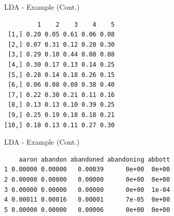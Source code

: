 \documentclass[
  ignorenonframetext,
  aspectratio=169]{beamer}
\newenvironment{Shaded}{\begin{snugshade}}{\end{snugshade}}
\newcommand{\CommentTok}[1]{\textcolor[rgb]{0.56,0.35,0.01}{\textit{#1}}}
\newcommand{\DecValTok}[1]{\textcolor[rgb]{0.00,0.00,0.81}{#1}}
\newcommand{\FunctionTok}[1]{\textcolor[rgb]{0.13,0.29,0.53}{\textbf{#1}}}
\newcommand{\NormalTok}[1]{#1}
\newcommand{\OtherTok}[1]{\textcolor[rgb]{0.56,0.35,0.01}{#1}}
\newcommand{\SpecialCharTok}[1]{\textcolor[rgb]{0.81,0.36,0.00}{\textbf{#1}}}
\begin{document}
\begin{frame}[fragile]{LDA - Example (Cont.)}
\label{lda---example-cont.}
\scriptsize

\begin{Shaded}
\end{Shaded}

\begin{verbatim}
         1    2    3    4    5
 [1,] 0.20 0.05 0.61 0.06 0.08
 [2,] 0.07 0.31 0.12 0.20 0.30
 [3,] 0.29 0.10 0.44 0.08 0.08
 [4,] 0.30 0.17 0.13 0.14 0.25
 [5,] 0.28 0.14 0.18 0.26 0.15
 [6,] 0.06 0.08 0.08 0.38 0.40
 [7,] 0.22 0.30 0.21 0.11 0.16
 [8,] 0.13 0.13 0.10 0.39 0.25
 [9,] 0.25 0.19 0.18 0.18 0.21
[10,] 0.18 0.13 0.11 0.27 0.30
\end{verbatim}
\end{frame}

\begin{frame}[fragile]{LDA - Example (Cont.)}
\label{lda---example-cont.-1}
\scriptsize

\begin{Shaded}
\end{Shaded}

\begin{verbatim}
    aaron abandon abandoned abandoning abbott
1 0.00000 0.00000   0.00039      0e+00  0e+00
2 0.00000 0.00000   0.00000      0e+00  0e+00
3 0.00000 0.00000   0.00000      0e+00  1e-04
4 0.00011 0.00016   0.00001      7e-05  0e+00
5 0.00000 0.00000   0.00006      0e+00  0e+00
\end{verbatim}
\end{frame}
\end{document}
